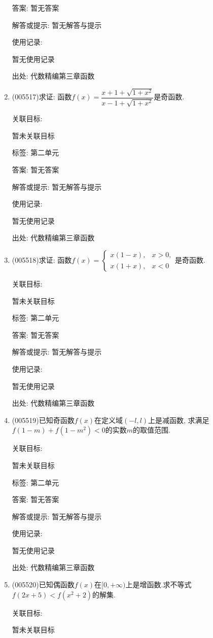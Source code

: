 \documentclass[10pt,a4paper]{article}
\begin{document}
\begin{enumerate}[1.]
答案: 暂无答案

解答或提示: 暂无解答与提示

使用记录:

暂无使用记录


出处: 代数精编第三章函数
\item { (005517)}求证: 函数$f(x)=\dfrac{x+1+\sqrt {1+x^2}}{x-1+\sqrt {1+x^2}}$是奇函数.


关联目标:

暂未关联目标



标签: 第二单元

答案: 暂无答案

解答或提示: 暂无解答与提示

使用记录:

暂无使用记录


出处: 代数精编第三章函数
\item { (005518)}求证: 函数$f(x)=\begin{cases}
   x(1-x), &  x>0,  \\ x(1+x), &  x<0  \end{cases}$是奇函数.


关联目标:

暂未关联目标



标签: 第二单元

答案: 暂无答案

解答或提示: 暂无解答与提示

使用记录:

暂无使用记录


出处: 代数精编第三章函数
\item { (005519)}已知奇函数$f(x)$在定义域$(-l, l)$上是减函数, 求满足$f(1-m)+f(1-m^2)<0$的实数$m$的取值范围.


关联目标:

暂未关联目标



标签: 第二单元

答案: 暂无答案

解答或提示: 暂无解答与提示

使用记录:

暂无使用记录


出处: 代数精编第三章函数
\item { (005520)}已知偶函数$f(x)$在$[0,+\infty)$上是增函数.求不等式$f(2x+5)<f(x^2+2)$的解集.


关联目标:

暂未关联目标




\end{enumerate}
\end{document}

